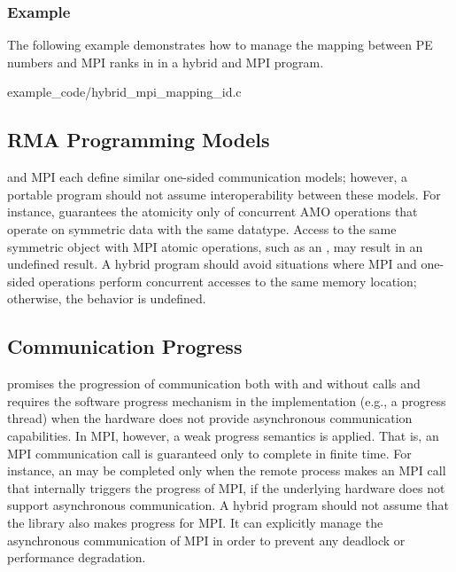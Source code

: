 \subsubsection*{Example}
\label{subsubsec:interoperability:id:example}
The following example demonstrates how to manage the mapping between \openshmem
\ac{PE} numbers and MPI ranks in  in a hybrid \openshmem
and MPI program.


      {example_code/hybrid_mpi_mapping_id.c}

\subsection{RMA Programming Models}
\label{subsec:interoperability:rma}

\openshmem and MPI each define similar one-sided communication models;
however, a portable program should not assume interoperability between these
models.
For instance, \openshmem guarantees the atomicity only of concurrent \openshmem AMO operations
that operate on symmetric data with the same datatype. Access to the same symmetric
object with MPI atomic operations, such as an , may
result in an undefined result. A hybrid program should avoid situations where MPI and
\openshmem one-sided operations perform concurrent accesses to the same memory
location; otherwise, the behavior is undefined.

\subsection{Communication Progress}
\label{subsec:interoperability:progress}

\openshmem promises the progression of communication both with and without
\openshmem calls and requires the software progress mechanism in the implementation
(e.g., a progress thread) when the hardware does not provide asynchronous communication
capabilities. In MPI, however, a weak progress semantics is applied. That is,
an MPI communication call is guaranteed only to complete in finite time. For
instance, an  may be completed only when the remote process makes an MPI
call that internally triggers the progress of MPI, if the underlying hardware
does not support asynchronous communication. A hybrid program
should not assume that the \openshmem library also makes progress for MPI.
It can explicitly manage the asynchronous communication of MPI in
order to prevent any deadlock or performance degradation.
